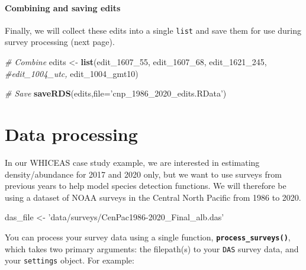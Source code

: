 \documentclass[
]{book}
\newenvironment{Shaded}{\begin{snugshade}}{\end{snugshade}}
\newcommand{\CommentTok}[1]{\textcolor[rgb]{0.56,0.35,0.01}{\textit{#1}}}
\newcommand{\DataTypeTok}[1]{\textcolor[rgb]{0.13,0.29,0.53}{#1}}
\newcommand{\DecValTok}[1]{\textcolor[rgb]{0.00,0.00,0.81}{#1}}
\newcommand{\KeywordTok}[1]{\textcolor[rgb]{0.13,0.29,0.53}{\textbf{#1}}}
\newcommand{\NormalTok}[1]{#1}
\newcommand{\StringTok}[1]{\textcolor[rgb]{0.31,0.60,0.02}{#1}}
\begin{document}
\hypertarget{combining-and-saving-edits}{%
\subsubsection*{Combining and saving edits}\label{combining-and-saving-edits}}

Finally, we will collect these edits into a single \texttt{list} and save them for use during survey processing (next page).

\begin{Shaded}
\begin{Highlighting}[]
\CommentTok{# Combine}
\NormalTok{edits <-}\StringTok{ }\KeywordTok{list}\NormalTok{(edit_}\DecValTok{1607}\NormalTok{_}\DecValTok{55}\NormalTok{,}
\NormalTok{              edit_}\DecValTok{1607}\NormalTok{_}\DecValTok{68}\NormalTok{,}
\NormalTok{              edit_}\DecValTok{1621}\NormalTok{_}\DecValTok{245}\NormalTok{,}
              \CommentTok{#edit_1004_utc,}
\NormalTok{              edit_}\DecValTok{1004}\NormalTok{_gmt10)}

\CommentTok{# Save}
\KeywordTok{saveRDS}\NormalTok{(edits,}\DataTypeTok{file=}\StringTok{'cnp_1986_2020_edits.RData'}\NormalTok{)}
\end{Highlighting}
\end{Shaded}

\hypertarget{processing}{%
\chapter{Data processing}\label{processing}}

In our WHICEAS case study example, we are interested in estimating density/abundance for 2017 and 2020 only, but we want to use surveys from previous years to help model species detection functions. We will therefore be using a dataset of NOAA surveys in the Central North Pacific from 1986 to 2020.

\begin{Shaded}
\begin{Highlighting}[]
\NormalTok{das_file <-}\StringTok{ 'data/surveys/CenPac1986-2020_Final_alb.das'}
\end{Highlighting}
\end{Shaded}

You can process your survey data using a single function, \textbf{\texttt{process\_surveys()}}, which takes two primary arguments: the filepath(s) to your \texttt{DAS} survey data, and your \texttt{settings} object. For example:
\end{document}

